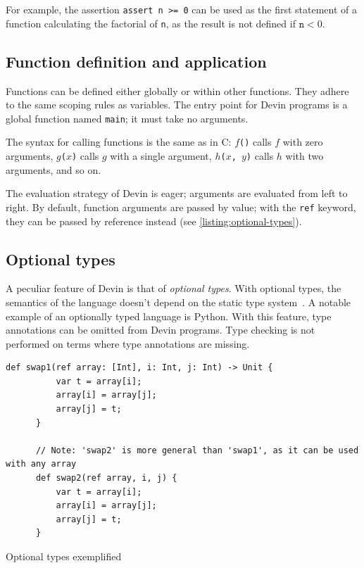 \documentclass[UdineBachThesis,american,11pt]{PhdThesis}
\begin{document}
  For example, the assertion \mbox{\texttt{assert n >= 0}} can be used as the
  first statement of a function calculating the factorial of \texttt{n}, as the
  result is not defined if \mbox{$\texttt{n} < 0$}.

  \subsection{Function definition and application}

  Functions can be defined either globally or within other functions. They
  adhere to the same scoping rules as variables. The entry point for Devin
  programs is a global function named \mbox{\texttt{main}}; it must take no
  arguments.

  The syntax for calling functions is the same as in C: \mbox{\texttt{$f$()}}
  calls $f$ with zero arguments, \mbox{\texttt{$g$($x$)}} calls $g$ with a
  single argument, \mbox{\texttt{$h$($x$, $y$)}} calls $h$ with two arguments,
  and so on.

  The evaluation strategy of Devin is eager; arguments are evaluated from left
  to right. By default, function arguments are passed by value; with the
  \mbox{\texttt{ref}} keyword, they can be passed by reference instead (see
  \autoref{listing:optional-types}).

  \subsection{Optional types}

  A peculiar feature of Devin is that of \emph{optional types}. With optional
  types, the semantics of the language doesn't depend on the static type
  system~\cite{pluggable-type-systems}. A notable example of an optionally typed
  language is Python. With this feature, type annotations can be omitted from
  Devin programs. Type checking is not performed on terms where type annotations
  are missing.

  \begin{Listing}[H]
    \begin{Verbatim}[gobble=6,fontsize=\small]
      def swap1(ref array: [Int], i: Int, j: Int) -> Unit {
          var t = array[i];
          array[i] = array[j];
          array[j] = t;
      }

      // Note: 'swap2' is more general than 'swap1', as it can be used with any array
      def swap2(ref array, i, j) {
          var t = array[i];
          array[i] = array[j];
          array[j] = t;
      }
    \end{Verbatim}

    \caption{Optional types exemplified}
    \label{listing:optional-types}
  \end{Listing}
\end{document}
